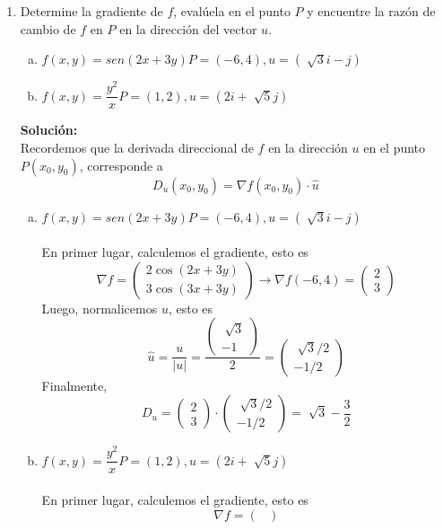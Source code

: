 \documentclass[12pt]{article}
\newenvironment{solucion}
{\begin{mdframed}[backgroundcolor=black!10]
		{\bf Solución:}\\
	}
	{
	\end{mdframed}
}
\newenvironment{preguntas}
{\begin{enumerate}\itemsep12pt
	}
	{
	\end{enumerate}
}
\newcommand{\ra}{\rightarrow}
\begin{document}
\begin{preguntas}
\begin{solucion}
\end{solucion}
\item Determine la gradiente de $f$, evalúela en el punto $P$ y encuentre la razón de cambio de $f$ en $P$ en la dirección del vector $u$.
\begin{enumerate}[a)]
\item $f(x,y) = sen(2x+3y)$\tab$P=(-6,4), u=\left(\sqrt[]{3}i - j\right)$
\item $f(x,y) = \dfrac{y^2}{x}$\tab$P=(1,2), u=\left(2i + \sqrt[]{5}j\right)$
\end{enumerate}
\begin{solucion}
Recordemos que la derivada direccional de $f$ en la dirección $u$ en el punto $P(x_0, y_0)$, corresponde a
$$D_u(x_0, y_0) = \nabla f(x_0, y_0) \cdot \hat{u}$$
\begin{enumerate}[a)]
\item $f(x,y) = sen(2x+3y)$\tab$P=(-6,4), u=\left(\sqrt[]{3}i - j\right)$\\
\\
En primer lugar, calculemos el gradiente, esto es
$$\nabla f = \begin{pmatrix}
2\cos(2x + 3y) \\
3\cos(3x + 3y)
\end{pmatrix} \ra 
\nabla f(-6,4) = \begin{pmatrix}
2 \\
3
\end{pmatrix}
$$
Luego, normalicemos $u$, esto es
$$\hat{u} = \dfrac{u}{|u|} = \dfrac{\begin{pmatrix}
\sqrt[]{3} \\
-1
\end{pmatrix}}{2} = \begin{pmatrix}
\sqrt[]{3}/2 \\
-1/2
\end{pmatrix}$$
Finalmente,
$$D_u = 
\begin{pmatrix}
2 \\
3
\end{pmatrix}
\cdot 
\begin{pmatrix}
\sqrt[]{3}/2 \\
-1/2
\end{pmatrix} = \sqrt[]{3} - \dfrac{3}{2}$$
\item $f(x,y) = \dfrac{y^2}{x}$\tab$P=(1,2), u=\left(2i + \sqrt[]{5}j\right)$\\
\\
En primer lugar, calculemos el gradiente, esto es
$$\nabla f = \begin{pmatrix}

\end{pmatrix}$$
\end{enumerate}
\end{solucion}
\end{preguntas}
\end{document}
